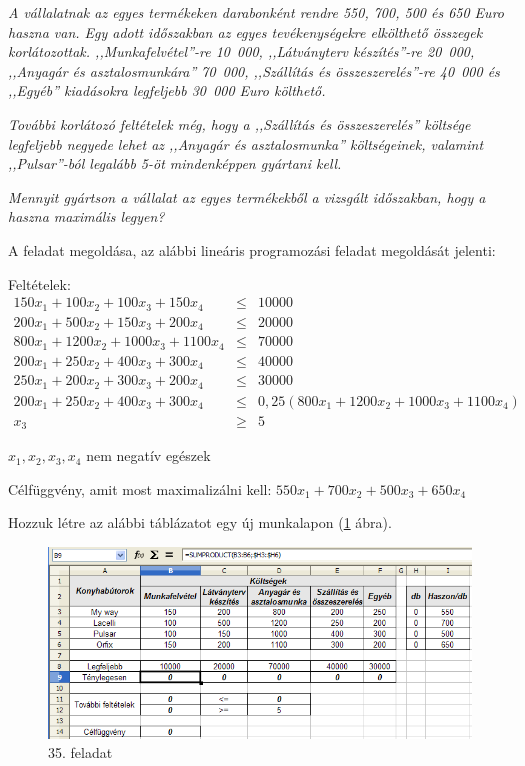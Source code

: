 {\itshape
A vállalatnak az egyes termékeken
darabonként rendre 550, 700, 500 és 650
Euro haszna van. Egy adott időszakban az
egyes tevékenységekre elkölthető összegek korlátozottak.
,,Munkafelvétel''-re 10~000, ,,Látványterv készítés''-re 20~000,
,,Anyagár és asztalosmunkára'' 70~000, ,,Szállítás és
összeszerelés''-re 40~000 és ,,Egyéb'' kiadásokra legfeljebb 30~000
Euro költhető. }

{\itshape
További korlátozó feltételek még, hogy a ,,Szállítás és
összeszerelés'' költsége legfeljebb negyede lehet az ,,Anyagár és
asztalosmunka'' költségeinek, valamint ,,Pulsar''-ból legalább 5-öt
mindenképpen gyártani kell.}

{\itshape
Mennyit gyártson a vállalat az egyes termékekből a vizsgált
időszakban, hogy a haszna maximális legyen?}

\clearpage
A feladat megoldása, az alábbi lineáris programozási feladat
megoldását jelenti:

Feltételek:
\begin{eqnarray*}
150x_1+100x_2+100x_3+150x_4&\leqslant &10000\\
200x_1+500x_2+150x_3+200x_4&\leqslant &20000\\
800x_1+1200x_2+1000x_3+1100x_4&\leqslant &70000\\
200x_1+250x_2+400x_3+300x_4&\leqslant &40000\\
250x_1+200x_2+300x_3+200x_4&\leqslant &30000\\
200x_1+250x_2+400x_3+300x_4&\leqslant
&0,25(800x_1+1200x_2+1000x_3+1100x_4)\\
x_{3}&\geqslant &5
\end{eqnarray*}
\begin{center}
$x_{1},x_{2},x_{3},x_{4}$ nem negatív egészek
\end{center}

Célfüggvény, amit most maximalizálni kell:
$550x_{1}+700x_{2}+500x_{3}+650x_{4}$

Hozzuk létre az alábbi táblázatot egy új munkalapon (\ref{35-feladat}
ábra).

\begin{figure}[!h]
\begin{center}
\includegraphics[width=15.999cm]{oocalcv1-img170.png}
\caption{35. feladat}\label{35-feladat}
\end{center}
\end{figure}

